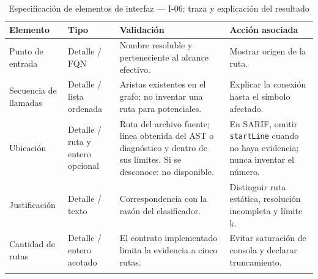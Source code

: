 \begin{table}[H]
\centering\small{}
\caption{Especificación de elementos de interfaz --- I-06: traza y explicación del resultado}
\begin{tabularx}{\textwidth}{P{3.0cm}P{2.3cm}YY}
\toprule
\textbf{Elemento} & \textbf{Tipo} & \textbf{Validación} & \textbf{Acción asociada} \\
\midrule
Punto de entrada & Detalle / FQN & Nombre resoluble y perteneciente al alcance efectivo. & Mostrar origen de la ruta. \\
\addlinespace
Secuencia de llamadas & Detalle / lista ordenada & Aristas existentes en el grafo; no inventar una ruta para potenciales. & Explicar la conexión hasta el símbolo afectado. \\
\addlinespace
Ubicación & Detalle / ruta y entero opcional & Ruta del archivo fuente; línea obtenida del AST o diagnóstico y dentro de sus límites. Si se desconoce: no disponible. & En SARIF, omitir \texttt{startLine} cuando no haya evidencia; nunca inventar el número. \\
\addlinespace
Justificación & Detalle / texto & Correspondencia con la razón del clasificador. & Distinguir ruta estática, resolución incompleta y límite k. \\
\addlinespace
Cantidad de rutas & Detalle / entero acotado & El contrato implementado limita la evidencia a cinco rutas. & Evitar saturación de consola y declarar truncamiento. \\
\addlinespace
\bottomrule
\end{tabularx}
\end{table}


